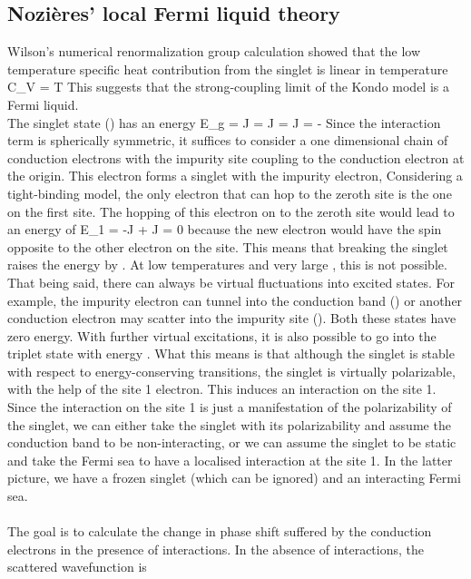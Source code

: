 \documentclass[14pt]{extarticle}
\numberwithin{equation}{section}
\begin{document}
\subsection{Nozières' local Fermi liquid theory}
Wilson's numerical renormalization group calculation showed that the low temperature specific heat contribution from the singlet is linear in temperature
\beq
C_V = \gamma T
\eeq
This suggests that the strong-coupling limit of the Kondo model is a Fermi liquid.\\
The singlet state () has an energy
\beq
E_g = J = J = J = -
\eeq
Since the interaction term is spherically symmetric, it suffices to consider a one dimensional chain of conduction electrons with the impurity site coupling to the conduction electron at the origin. This electron forms a singlet with the impurity electron,
\beq
{}
\eeq
Considering a tight-binding model, the only electron that can hop to the zeroth site is the one on the first site. The hopping of this electron on to the zeroth site would lead to an energy of
\beq
E_1 = -J + J = 0
\eeq
because the new electron would have the spin opposite to the other electron on the  site. This means that breaking the singlet raises the energy by . At low temperatures and very large , this is not possible. That being said, there can always be virtual fluctuations into excited states. For example, the impurity electron can tunnel into the conduction band () or another conduction electron may scatter into the impurity site (). Both these states have zero energy. With further virtual excitations, it is also possible to go into the triplet state with energy . What this means is that although the singlet is stable with respect to energy-conserving transitions, the singlet is virtually polarizable, with the help of the site 1 electron. This induces an interaction on the site 1. Since the interaction on the site 1 is just a manifestation of the polarizability of the singlet, we can either take the singlet with its polarizability and assume the conduction band to be non-interacting, or we can assume the singlet to be static and take the Fermi sea to have a localised interaction at the site 1. In the latter picture, we have a frozen singlet (which can be ignored) and an interacting Fermi sea.\\\\
The goal is to calculate the change in phase shift suffered by the conduction electrons in the presence of interactions. In the absence of interactions, the scattered wavefunction is
\end{document}
